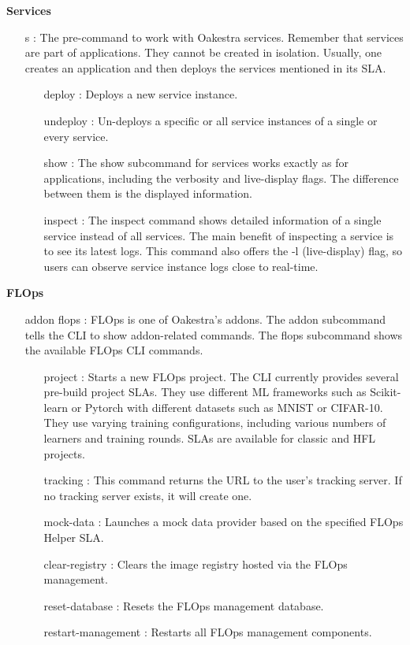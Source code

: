 \textbf{Services}
\begin{itemize}
    \item [s]:
        The pre-command to work with Oakestra services.
        Remember that services are part of applications.
        They cannot be created in isolation.
        Usually, one creates an application and then deploys the services mentioned in its SLA.
        \begin{itemize}
            \item [deploy]:
                Deploys a new service instance.
            \item [undeploy]:
                Un-deploys a specific or all service instances of a single or every service.
            \item [show]:
                The show subcommand for services works exactly as for applications, including the verbosity and live-display flags.
                The difference between them is the displayed information.
            \item [inspect]:
                The inspect command shows detailed information of a single service instead of all services.
                The main benefit of inspecting a service is to see its latest logs.
                This command also offers the -l (live-display) flag, so users can observe service instance logs close to real-time.
        \end{itemize}
\end{itemize}
\vspace{5mm}
\textbf{FLOps}
\begin{itemize}
    \item [addon flops]:
        FLOps is one of Oakestra's addons.
        The addon subcommand tells the CLI to show addon-related commands.
        The flops subcommand shows the available FLOps CLI commands.
        \begin{itemize}
            \item [project]:
                Starts a new FLOps project.
                The CLI currently provides several pre-build project SLAs.
                They use different ML frameworks such as Scikit-learn or Pytorch with different datasets such as MNIST or CIFAR-10.
                They use varying training configurations, including various numbers of learners and training rounds.
                SLAs are available for classic and HFL projects.
            \item [tracking]:
                This command returns the URL to the user's tracking server.
                If no tracking server exists, it will create one.
            \item [mock-data]:
                Launches a mock data provider based on the specified FLOps Helper SLA.
            \item [clear-registry]:
                Clears the image registry hosted via the FLOps management.
            \item [reset-database]:
                Resets the FLOps management database.
            \item [restart-management]:
                Restarts all FLOps management components.
        \end{itemize}
\end{itemize}
